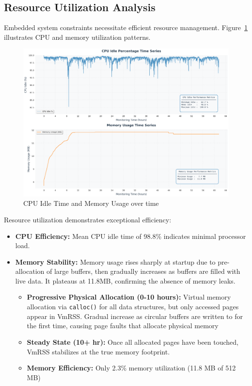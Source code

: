 \documentclass[12pt,a4paper]{article}
\begin{document}
\subsection{Resource Utilization Analysis}

Embedded system constraints necessitate efficient resource management. Figure~\ref{fig:cpu_memory} illustrates CPU and memory utilization patterns.

\begin{figure}[H]
    \centering
    \includegraphics[width=\textwidth]{../plots/62-hours/system_resources_cpu_memory_usage.png}
    \caption{CPU Idle Time and Memory Usage over time}
    \label{fig:cpu_memory}
\end{figure}

Resource utilization demonstrates exceptional efficiency:

\begin{itemize}
    \item \textbf{CPU Efficiency:} Mean CPU idle time of 98.8\% indicates minimal processor load.
    
    \item \textbf{Memory Stability:} Memory usage rises sharply at startup due to pre-allocation of large buffers, then gradually increases as buffers are filled with live data. It plateaus at 11.8MB, confirming the absence of memory leaks.   
    \begin{itemize}
        \item \textbf{Progressive Physical Allocation (0-10 hours):} Virtual memory allocation via \texttt{calloc()} for all data structures, but only accessed pages appear in VmRSS. Gradual increase as circular buffers are written to for the first time, causing page faults that allocate physical memory        

        \item \textbf{Steady State (10+ hr):} Once all allocated pages have been touched, VmRSS stabilizes at the true memory footprint.

        \item \textbf{Memory Efficiency:} Only 2.3\% memory utilization (11.8 MB of 512 MB)
    \end{itemize}

\end{itemize}
\end{document}
